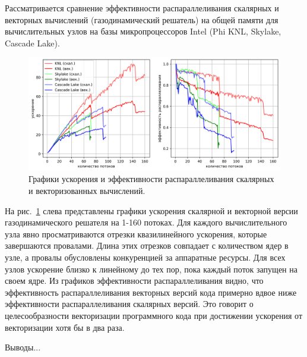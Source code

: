 \documentclass[a4paper,14pt]{extarticle}                     %
\theoremstyle{plain}                                         %
\begin{document}
Рассматривается сравнение эффективности распараллеливания скалярных и векторных вычислений (газодинамический решатель) на общей памяти для вычислительных узлов на базы микропроцессоров Intel (Phi KNL, Skylake, Cascade Lake).

\begin{figure}[ht]
\centering
\includegraphics[width=1.0\textwidth]{./fig/par_openmp_scalar_vec_chart.png}
\singlespacing
\caption{Графики ускорения и эффективности распараллеливания скалярных и векторизованных вычислений.}
\label{fig:text_3_omp2}
\end{figure}

На рис.~\ref{fig:text_3_omp2} слева представлены графики ускорения скалярной и векторной версии газодинамического решателя на 1-160 потоках.
Для каждого вычислительного узла явно просматриваются отрезки квазилинейного ускорения, которые завершаются провалами.
Длина этих отрезков совпадает с количеством ядер в узле, а провалы обусловлены конкуренцией за аппаратные ресурсы.
Для всех узлов ускорение близко к линейному до тех пор, пока каждый поток запущен на своем ядре.
Из графиков эффективности распараллеливания видно, что эффективность распараллеливания векторных версий кода примерно вдвое ниже эффективности распараллеливания скалярных версий.
Это говорит о целесообразности векторизации программного кода при достижении ускорения от векторизации хотя бы в два раза.


Выводы...

\end{document}
